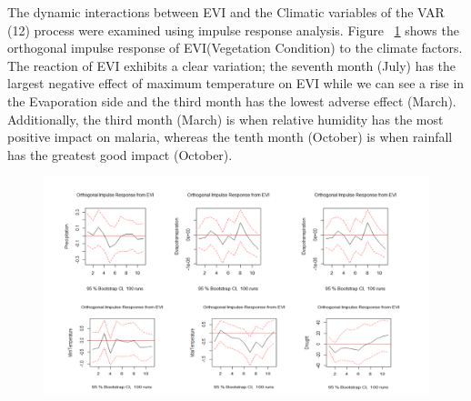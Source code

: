 The dynamic interactions between EVI and the Climatic variables of the VAR (12) process were examined using impulse response analysis. Figure ~\ref{fig:impose} shows the orthogonal impulse response of EVI(Vegetation Condition) to the climate factors. The reaction of EVI exhibits a clear variation; the seventh month (July) has the largest negative effect of maximum temperature on EVI while we can see a rise in the Evaporation side and the third month has the lowest adverse effect (March). Additionally, the third month (March) is when relative humidity has the most positive impact on malaria, whereas the tenth month (October) is when rainfall has the greatest good impact (October).
\begin{figure}
	\centering
	\includegraphics[width=1\linewidth]{images/impose}
	\caption{}
	\label{fig:impose}
\end{figure}
